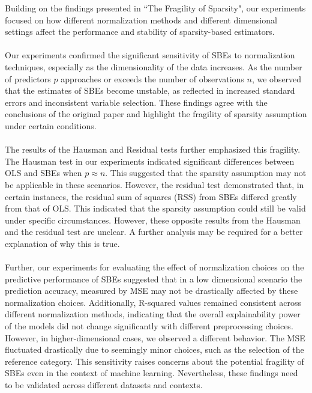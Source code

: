 Building on the findings presented in ``The Fragility of Sparsity", our experiments focused on how different normalization methods and different dimensional settings affect the performance and stability of sparsity-based estimators. \\
\\
Our experiments confirmed the significant sensitivity of SBEs to normalization techniques, especially as the dimensionality of the data increases. As the number of predictors $p$ approaches or exceeds the number of observations $n$, we observed that the estimates of SBEs become unstable, as reflected in increased standard errors and inconsistent variable selection. These findings agree with the conclusions of the original paper and highlight the fragility of sparsity assumption under certain conditions. 
\\
\\
The results of the Hausman and Residual tests further emphasized this fragility. The Hausman test in our experiments indicated significant differences between OLS and SBEs when $p \approx n$. This suggested that the sparsity assumption may not be applicable in these scenarios. However, the residual test demonstrated that, in certain instances, the residual sum of squares (RSS) from SBEs differed greatly from that of OLS. This indicated that the sparsity assumption could still be valid under specific circumstances. However, these opposite results from the Hausman and the residual test are unclear. A further analysis may be required for a better explanation of why this is true. \\
\\
Further, our experiments for evaluating the effect of normalization choices on the predictive performance of SBEs suggested that in a low dimensional scenario the prediction accuracy, measured by MSE may not be drastically affected by these normalization choices. Additionally, R-squared values remained consistent across different normalization methods, indicating that the overall explainability power of the models did not change significantly with different preprocessing choices. However, in higher-dimensional cases, we observed a different behavior. The MSE fluctuated drastically due to seemingly minor choices, such as the selection of the reference category. This sensitivity raises concerns about the potential fragility of SBEs even in the context of machine learning. Nevertheless, these findings need to be validated across different datasets and contexts.\\
